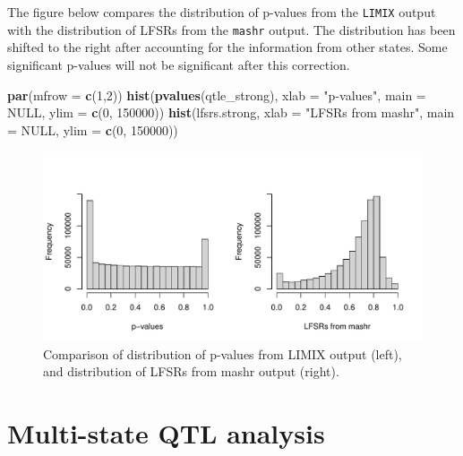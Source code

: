 \documentclass[
]{article}
\newenvironment{Shaded}{\begin{snugshade}}{\end{snugshade}}
\newcommand{\AttributeTok}[1]{\textcolor[rgb]{0.13,0.29,0.53}{#1}}
\newcommand{\ConstantTok}[1]{\textcolor[rgb]{0.56,0.35,0.01}{#1}}
\newcommand{\DecValTok}[1]{\textcolor[rgb]{0.00,0.00,0.81}{#1}}
\newcommand{\FunctionTok}[1]{\textcolor[rgb]{0.13,0.29,0.53}{\textbf{#1}}}
\newcommand{\NormalTok}[1]{#1}
\newcommand{\StringTok}[1]{\textcolor[rgb]{0.31,0.60,0.02}{#1}}
\begin{document}
\normalsize

The figure below compares the distribution of p-values from the
\texttt{LIMIX} output with the distribution of LFSRs from the
\texttt{mashr} output. The distribution has been shifted to the right
after accounting for the information from other states. Some significant
p-values will not be significant after this correction.

\footnotesize

\begin{Shaded}
\begin{Highlighting}[]
\FunctionTok{par}\NormalTok{(}\AttributeTok{mfrow =} \FunctionTok{c}\NormalTok{(}\DecValTok{1}\NormalTok{,}\DecValTok{2}\NormalTok{))}
\FunctionTok{hist}\NormalTok{(}\FunctionTok{pvalues}\NormalTok{(qtle\_strong), }\AttributeTok{xlab =} \StringTok{"p{-}values"}\NormalTok{, }\AttributeTok{main =} \ConstantTok{NULL}\NormalTok{, }\AttributeTok{ylim =} \FunctionTok{c}\NormalTok{(}\DecValTok{0}\NormalTok{, }\DecValTok{150000}\NormalTok{))}
\FunctionTok{hist}\NormalTok{(lfsrs.strong, }\AttributeTok{xlab =} \StringTok{"LFSRs from mashr"}\NormalTok{, }\AttributeTok{main =} \ConstantTok{NULL}\NormalTok{, }\AttributeTok{ylim =} \FunctionTok{c}\NormalTok{(}\DecValTok{0}\NormalTok{, }\DecValTok{150000}\NormalTok{))}
\end{Highlighting}
\end{Shaded}

\begin{figure}
\centering
\includegraphics{Chapter_5_Analysis_files/figure-latex/pval-plot-1.pdf}
\caption{Comparison of distribution of p-values from LIMIX output
(left), and distribution of LFSRs from mashr output (right).}
\end{figure}

\normalsize

\hypertarget{multi-state-qtl-analysis}{%
\section{Multi-state QTL analysis}\label{multi-state-qtl-analysis}}
\end{document}
